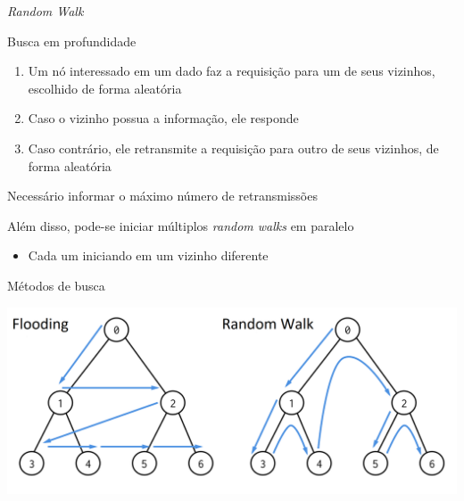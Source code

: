 \documentclass[compress]{beamer}
\begin{document}

\begin{frame}{\textit{Random Walk}}

Busca em profundidade

\begin{enumerate}
    \item Um nó interessado em um dado faz a requisição para um de seus vizinhos, escolhido de forma aleatória
    \item Caso o vizinho possua a informação, ele responde
    \item Caso contrário, ele retransmite a requisição para outro de seus vizinhos, de forma aleatória
\end{enumerate}

Necessário informar o máximo número de retransmissões

Além disso, pode-se iniciar múltiplos \textit{random walks} em paralelo
\begin{itemize}
    \item Cada um iniciando em um vizinho diferente
\end{itemize}
\end{frame}


\begin{frame}{Métodos de busca}

\vspace{1cm}

\centering \includegraphics[width=\textwidth]{images/busca.png}
\end{frame}

\end{document}
